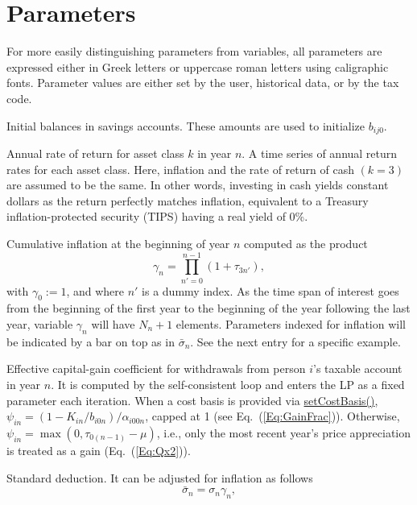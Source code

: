 \documentclass[fleqn,12pt]{report}
\newcommand{\code}[1]{\url{#1}}
\begin{document}
\section{Parameters}
For more easily distinguishing parameters from variables, all parameters are expressed
either in Greek letters or uppercase roman letters using caligraphic fonts.
Parameter values are either set by the user, historical data, or by the tax code.
\begin{description}[leftmargin=4em,style=multiline]
\item [$\beta_{ij}$]
	Initial balances in savings accounts. These amounts are used to initialize $b_{ij0}$.
\item [$\tau_{kn}$]
	Annual rate of return for asset class $k$ in year $n$.
	A time series of annual return rates for each asset class.
	Here, inflation and the rate of return of cash $(k=3)$ are assumed to be the same.
	In other words, investing in cash yields constant dollars as the return perfectly
	matches inflation, equivalent to a Treasury inflation-protected security (TIPS) having
	a real yield of 0\%.
\item [$\gamma_n$]
	Cumulative inflation at the beginning of year $n$ computed as the product
	\begin{equation}
		\gamma_n = \prod_{n' = 0}^{n-1} (1 + \tau_{3n'}),
	\end{equation}
	with $\gamma_0 := 1$, and where $n'$ is a dummy index.
	As the time span of interest goes from the beginning of the first year to the beginning
        of the year following the last year, variable $\gamma_n$ will have $N_n + 1$ elements.
	Parameters indexed for inflation will be indicated by a bar on top as in $\bar{\sigma}_n$.
	See the next entry for a specific example.
\item [$\psi_{in}$]
	Effective capital-gain coefficient for withdrawals from person $i$'s taxable account
	in year $n$.  It is computed by the self-consistent loop and enters the LP as a
	fixed parameter each iteration.
	When a cost basis is provided via \code{setCostBasis()},
	$\psi_{in} = (1 - K_{in}/b_{i0n})/\alpha_{i00n}$, capped at 1 (see Eq.~(\ref{Eq:GainFrac})).
	Otherwise, $\psi_{in} = \max(0,\tau_{0(n-1)}-\mu)$, i.e., only the most
	recent year's price appreciation is treated as a gain (Eq.~(\ref{Eq:Qx2})).
\item [$\sigma_n$]
	Standard deduction. It can be adjusted for inflation as follows
	\begin{equation}
		\bar\sigma_n = \sigma_n \gamma_n,
	\end{equation}

\end{description}
\end{document}
